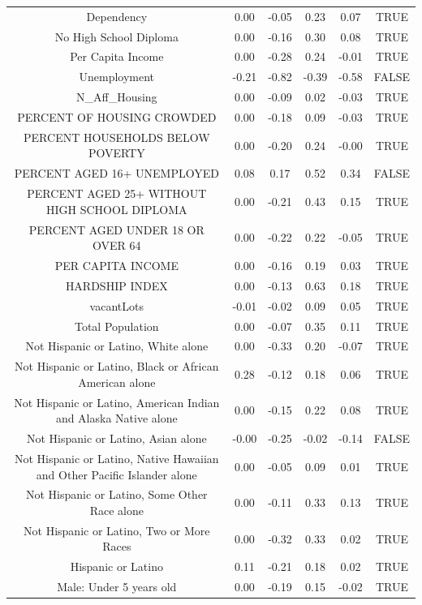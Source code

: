 \documentclass{article} %
\begin{document}
\begin{table}[H]
\begin{adjustbox}{width = \textwidth}
\begin{tabular}{cccccc}
  Dependency & 0.00 & -0.05 & 0.23 & 0.07 & TRUE \\ 
  No High School Diploma & 0.00 & -0.16 & 0.30 & 0.08 & TRUE \\ 
  Per Capita Income & 0.00 & -0.28 & 0.24 & -0.01 & TRUE \\ 
  Unemployment & -0.21 & -0.82 & -0.39 & -0.58 & FALSE \\ 
  N\_Aff\_Housing & 0.00 & -0.09 & 0.02 & -0.03 & TRUE \\ 
  PERCENT OF HOUSING CROWDED & 0.00 & -0.18 & 0.09 & -0.03 & TRUE \\ 
  PERCENT HOUSEHOLDS BELOW POVERTY & 0.00 & -0.20 & 0.24 & -0.00 & TRUE \\ 
  PERCENT AGED 16+ UNEMPLOYED & 0.08 & 0.17 & 0.52 & 0.34 & FALSE \\ 
  PERCENT AGED 25+ WITHOUT HIGH SCHOOL DIPLOMA & 0.00 & -0.21 & 0.43 & 0.15 & TRUE \\ 
  PERCENT AGED UNDER 18 OR OVER 64 & 0.00 & -0.22 & 0.22 & -0.05 & TRUE \\ 
  PER CAPITA INCOME & 0.00 & -0.16 & 0.19 & 0.03 & TRUE \\ 
  HARDSHIP INDEX & 0.00 & -0.13 & 0.63 & 0.18 & TRUE \\ 
  vacantLots & -0.01 & -0.02 & 0.09 & 0.05 & TRUE \\ 
  Total Population & 0.00 & -0.07 & 0.35 & 0.11 & TRUE \\ 
  Not Hispanic or Latino, White alone & 0.00 & -0.33 & 0.20 & -0.07 & TRUE \\ 
  Not Hispanic or Latino, Black or African American alone & 0.28 & -0.12 & 0.18 & 0.06 & TRUE \\ 
  Not Hispanic or Latino, American Indian and Alaska Native alone & 0.00 & -0.15 & 0.22 & 0.08 & TRUE \\ 
  Not Hispanic or Latino, Asian alone & -0.00 & -0.25 & -0.02 & -0.14 & FALSE \\ 
  Not Hispanic or Latino, Native Hawaiian and Other Pacific Islander alone & 0.00 & -0.05 & 0.09 & 0.01 & TRUE \\ 
  Not Hispanic or Latino, Some Other Race alone & 0.00 & -0.11 & 0.33 & 0.13 & TRUE \\ 
  Not Hispanic or Latino, Two or More Races & 0.00 & -0.32 & 0.33 & 0.02 & TRUE \\ 
  Hispanic or Latino & 0.11 & -0.21 & 0.18 & 0.02 & TRUE \\ 
  Male: Under 5 years old & 0.00 & -0.19 & 0.15 & -0.02 & TRUE \\ 

\end{tabular}
\end{adjustbox}
\end{table}
\end{document}
